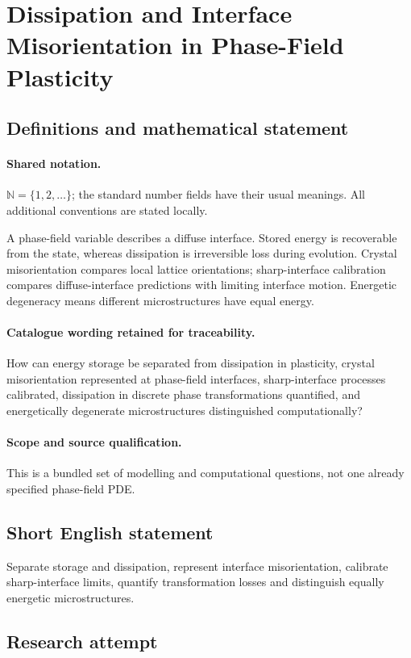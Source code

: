 \documentclass[11pt]{article}
\begin{document}
\section{Dissipation and Interface Misorientation in Phase-Field Plasticity}\label{statement}

\subsection{Definitions and mathematical statement}

\paragraph{Shared notation.}$\mathbb N=\{1,2,\ldots\}$; the standard number fields have their usual meanings. All additional conventions are stated locally.


A phase-field variable describes a diffuse interface. Stored energy is recoverable from the state, whereas dissipation is irreversible loss during evolution. Crystal misorientation compares local lattice orientations; sharp-interface calibration compares diffuse-interface predictions with limiting interface motion. Energetic degeneracy means different microstructures have equal energy.

\paragraph{Catalogue wording retained for traceability.}
How can energy storage be separated from dissipation in plasticity, crystal misorientation represented at phase-field interfaces, sharp-interface processes calibrated, dissipation in discrete phase transformations quantified, and energetically degenerate microstructures distinguished computationally?

\paragraph{Scope and source qualification.}This is a bundled set of modelling and computational questions, not one already specified phase-field PDE.
\subsection{Short English statement}
Separate storage and dissipation, represent interface misorientation, calibrate sharp-interface limits, quantify transformation losses and distinguish equally energetic microstructures.
\subsection{Research attempt}
\end{document}
